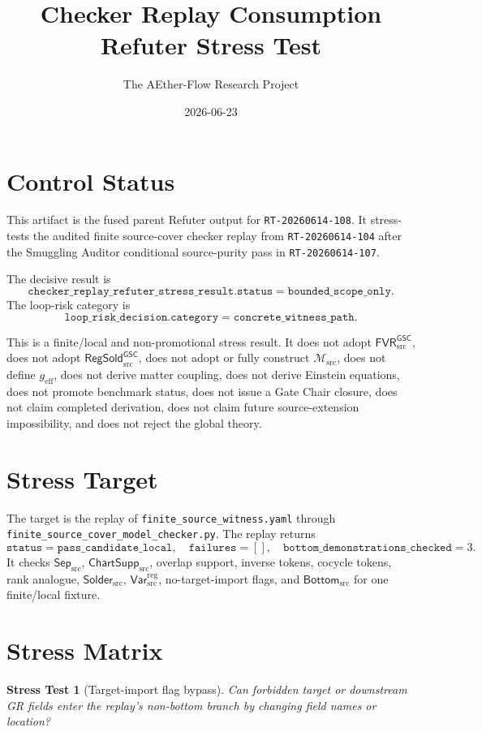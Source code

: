 \documentclass[11pt]{article}
\title{Checker Replay Consumption Refuter Stress Test}
\author{The AEther-Flow Research Project}
\date{2026-06-23}
\newcommand{\Msrc}{\mathcal{M}_{\mathrm{src}}}
\newcommand{\geff}{g_{\mathrm{eff}}}
\newcommand{\RegSold}{\mathsf{RegSold}_{\mathrm{src}}^{\mathsf{GSC}}}
\newcommand{\FVRSrc}{\mathsf{FVR}_{\mathrm{src}}^{\mathsf{GSC}}}
\newcommand{\SepSrc}{\mathsf{Sep}_{\mathrm{src}}}
\newcommand{\ChartSuppSrc}{\mathsf{ChartSupp}_{\mathrm{src}}}
\newcommand{\SolderSrc}{\mathsf{Solder}_{\mathrm{src}}}
\newcommand{\VarRegSrc}{\mathsf{Var}^{\mathrm{reg}}_{\mathrm{src}}}
\newcommand{\BottomSrc}{\mathsf{Bottom}_{\mathrm{src}}}
\newtheorem{stress}{Stress Test}
\begin{document}
\maketitle

\section*{Control Status}

This artifact is the fused parent Refuter output for
\texttt{RT-20260614-108}. It stress-tests the audited finite source-cover
checker replay from \texttt{RT-20260614-104} after the Smuggling Auditor
conditional source-purity pass in \texttt{RT-20260614-107}.

The decisive result is
\[
  \texttt{checker\_replay\_refuter\_stress\_result.status}
  =
  \texttt{bounded\_scope\_only}.
\]
The loop-risk category is
\[
  \texttt{loop\_risk\_decision.category}
  =
  \texttt{concrete\_witness\_path}.
\]

This is a finite/local and non-promotional stress result. It does not adopt
\(\FVRSrc\), does not adopt \(\RegSold\), does not adopt or fully construct
\(\Msrc\), does not define \(\geff\), does not derive matter coupling, does
not derive Einstein equations, does not promote benchmark status, does not
issue a Gate Chair closure, does not claim completed derivation, does not
claim future source-extension impossibility, and does not reject the global
theory.

\section{Stress Target}

The target is the replay of \texttt{finite\_source\_witness.yaml} through
\texttt{finite\_source\_cover\_model\_checker.py}. The replay returns
\[
  \texttt{status}=\texttt{pass\_candidate\_local},
  \quad
  \texttt{failures}=[],
  \quad
  \texttt{bottom\_demonstrations\_checked}=3.
\]
It checks \(\SepSrc\), \(\ChartSuppSrc\), overlap support, inverse tokens,
cocycle tokens, rank analogue, \(\SolderSrc\), \(\VarRegSrc\), no-target-import
flags, and \(\BottomSrc\) for one finite/local fixture.

\section{Stress Matrix}

\begin{stress}[Target-import flag bypass]
Can forbidden target or downstream GR fields enter the replay's non-bottom
branch by changing field names or location?
\end{stress}
\end{document}
